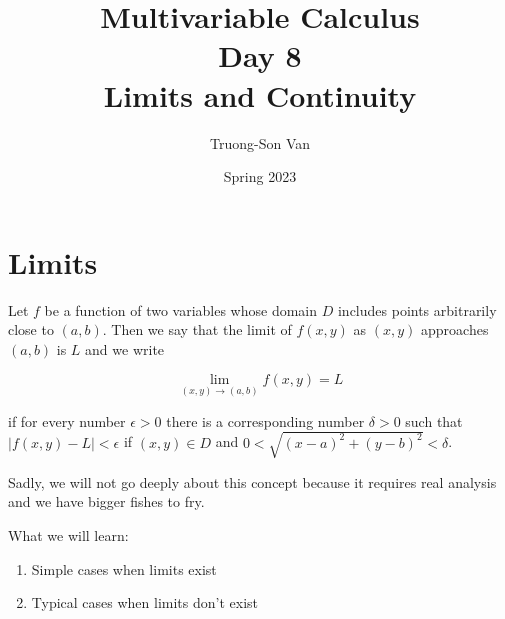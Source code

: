 \documentclass[aspectratio=169,handout]{beamer}
\title{ Multivariable Calculus \\ Day 8 \\ Limits and Continuity}
\institute{Fulbright University Vietnam}
\author{Truong-Son Van}
\date{Spring 2023}
\begin{document}
\maketitle


\section{Limits}


\begin{frame}
    \begin{definition}
Let $f$ be a function of two variables whose domain $D$ includes points arbitrarily close to $(a,b)$. Then we say that the limit of $f(x,y)$ as $(x,y)$ approaches $(a,b)$ is $L$ and we write

$$\lim_{(x,y)\to(a,b)} f(x,y) = L$$

if for every number $\epsilon > 0$ there is a corresponding number $\delta > 0$ such that
$|f(x,y) - L| < \epsilon$
if $(x,y) \in D$ and $0 < \sqrt{(x-a)^2 + (y-b)^2} < \delta$.
    \end{definition}
\end{frame}


\begin{frame}
    Sadly, we will not go deeply about this concept because it requires real analysis and
    we have bigger fishes to fry.

    What we will learn:
    \begin{enumerate}
        \item Simple cases when limits exist
        \item Typical cases when limits don't exist
    \end{enumerate}
\end{frame}
\end{document}
